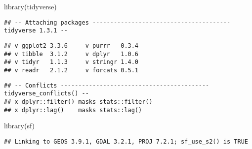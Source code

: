 \documentclass[
]{book}
\newenvironment{Shaded}{\begin{snugshade}}{\end{snugshade}}
\newcommand{\FunctionTok}[1]{\textcolor[rgb]{0.00,0.00,0.00}{#1}}
\newcommand{\NormalTok}[1]{#1}
\begin{document}
\begin{Shaded}
\begin{Highlighting}[]
\FunctionTok{library}\NormalTok{(tidyverse)}
\end{Highlighting}
\end{Shaded}

\begin{verbatim}
## -- Attaching packages --------------------------------------- tidyverse 1.3.1 --
\end{verbatim}

\begin{verbatim}
## v ggplot2 3.3.6     v purrr   0.3.4
## v tibble  3.1.2     v dplyr   1.0.6
## v tidyr   1.1.3     v stringr 1.4.0
## v readr   2.1.2     v forcats 0.5.1
\end{verbatim}

\begin{verbatim}
## -- Conflicts ------------------------------------------ tidyverse_conflicts() --
## x dplyr::filter() masks stats::filter()
## x dplyr::lag()    masks stats::lag()
\end{verbatim}

\begin{Shaded}
\begin{Highlighting}[]
\FunctionTok{library}\NormalTok{(sf)}
\end{Highlighting}
\end{Shaded}

\begin{verbatim}
## Linking to GEOS 3.9.1, GDAL 3.2.1, PROJ 7.2.1; sf_use_s2() is TRUE
\end{verbatim}
\end{document}
